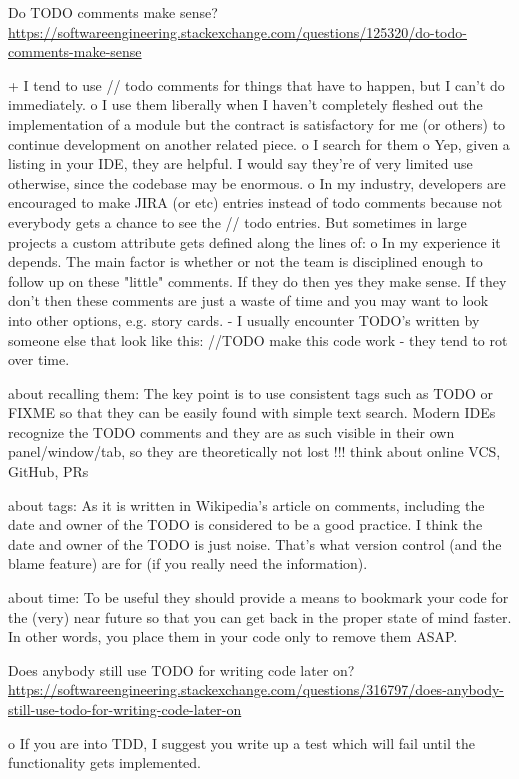 Do TODO comments make sense? \url{https://softwareengineering.stackexchange.com/questions/125320/do-todo-comments-make-sense}

+ I tend to use // todo comments for things that have to happen, but I can't do immediately.
o I use them liberally when I haven't completely fleshed out the implementation of a module but the contract is satisfactory for me (or others) to continue development on another related piece.
o I search for them
o Yep, given a listing in your IDE, they are helpful. I would say they're of very limited use otherwise, since the codebase may be enormous.
o In my industry, developers are encouraged to make JIRA (or etc) entries instead of todo comments because not everybody gets a chance to see the // todo entries. But sometimes in large projects a custom attribute gets defined along the lines of:
o In my experience it depends. The main factor is whether or not the team is disciplined enough to follow up on these "little" comments. If they do then yes they make sense. If they don't then these comments are just a waste of time and you may want to look into other options, e.g. story cards.
- I usually encounter TODO's written by someone else that look like this: //TODO make this code work
- they tend to rot over time.

about recalling them:
The key point is to use consistent tags such as TODO or FIXME so that they can be easily found with simple text search.
Modern IDEs recognize the TODO comments and they are as such visible in their own panel/window/tab, so they are theoretically not lost !!! think about online VCS, GitHub, PRs

about tags:
As it is written in Wikipedia's article on comments, including the date and owner of the TODO is considered to be a good practice.
I think the date and owner of the TODO is just noise. That's what version control (and the blame feature) are for (if you really need the information).

about time:
To be useful they should provide a means to bookmark your code for the (very) near future so that you can get back in the proper state of mind faster. In other words, you place them in your code only to remove them ASAP.


Does anybody still use TODO for writing code later on? \url{https://softwareengineering.stackexchange.com/questions/316797/does-anybody-still-use-todo-for-writing-code-later-on}

o If you are into TDD, I suggest you write up a test which will fail until the functionality gets implemented.

